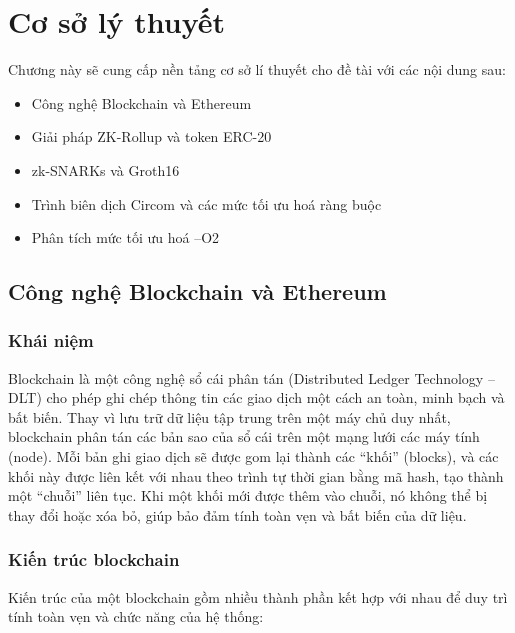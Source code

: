 \chapter{Cơ sở lý thuyết}
\label{chap:chap3}
Chương này sẽ cung cấp nền tảng cơ sở lí thuyết cho đề tài với các nội dung sau:
\begin{itemize}
    \item Công nghệ Blockchain và Ethereum
    \item Giải pháp ZK-Rollup và token ERC-20
    \item zk-SNARKs và Groth16
    \item Trình biên dịch Circom và các mức tối ưu hoá ràng buộc
    \item Phân tích mức tối ưu hoá --O2
\end{itemize}
\section{Công nghệ Blockchain và Ethereum}
\subsection{Khái niệm}
Blockchain là một công nghệ sổ cái phân tán (Distributed Ledger Technology -- DLT) cho phép ghi chép thông tin các giao dịch một cách an toàn, minh bạch và bất biến. Thay vì lưu trữ dữ liệu tập trung trên một máy chủ duy nhất, blockchain phân tán các bản sao của sổ cái trên một mạng lưới các máy tính (node). Mỗi bản ghi giao dịch sẽ được gom lại thành các ``khối'' (blocks), và các khối này được liên kết với nhau theo trình tự thời gian bằng mã hash, tạo thành một ``chuỗi'' liên tục. Khi một khối mới được thêm vào chuỗi, nó không thể bị thay đổi hoặc xóa bỏ, giúp bảo đảm tính toàn vẹn và bất biến của dữ liệu.
\subsection{Kiến trúc blockchain}
Kiến trúc của một blockchain gồm nhiều thành phần kết hợp với nhau để duy trì tính toàn vẹn và chức năng của hệ thống:


